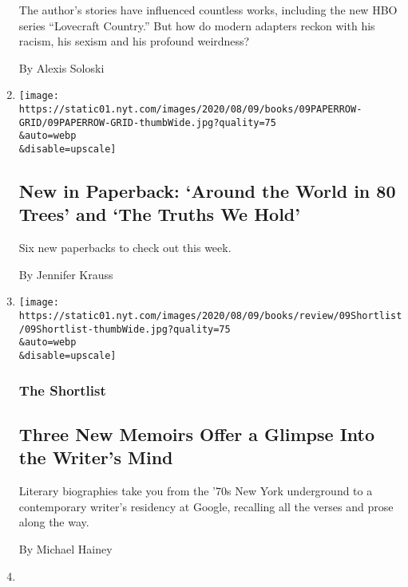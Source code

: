 \begin{enumerate}
  The author's stories have influenced countless works, including the
  new HBO series ``Lovecraft Country.'' But how do modern adapters
  reckon with his racism, his sexism and his profound weirdness?

  By Alexis Soloski
\item
  \href{/2020/08/07/books/review/new-paperbacks.html}{}

  \texttt{[image: https://static01.nyt.com/images/2020/08/09/books/09PAPERROW-GRID/09PAPERROW-GRID-thumbWide.jpg?quality=75\\\&auto=webp\\\&disable=upscale]}

  \hypertarget{new-in-paperback-around-the-world-in-80-trees-and-the-truths-we-hold}{%
  \subsection{New in Paperback: `Around the World in 80 Trees' and `The
  Truths We
  Hold'}\label{new-in-paperback-around-the-world-in-80-trees-and-the-truths-we-hold}}

  Six new paperbacks to check out this week.

  By Jennifer Krauss
\item
  \href{/2020/08/07/books/review/three-new-memoirs-offer-a-glimpse-into-the-writers-mind.html}{}

  \texttt{[image: https://static01.nyt.com/images/2020/08/09/books/review/09Shortlist/09Shortlist-thumbWide.jpg?quality=75\\\&auto=webp\\\&disable=upscale]}

  \hypertarget{the-shortlist}{%
  \subsubsection{The Shortlist}\label{the-shortlist}}

  \hypertarget{three-new-memoirs-offer-a-glimpse-into-the-writers-mind}{%
  \subsection{Three New Memoirs Offer a Glimpse Into the Writer's
  Mind}\label{three-new-memoirs-offer-a-glimpse-into-the-writers-mind}}

  Literary biographies take you from the '70s New York underground to a
  contemporary writer's residency at Google, recalling all the verses
  and prose along the way.

  By Michael Hainey
\item
  \href{/2020/08/07/books/review/letters-to-the-editor.html}{}


\end{enumerate}
